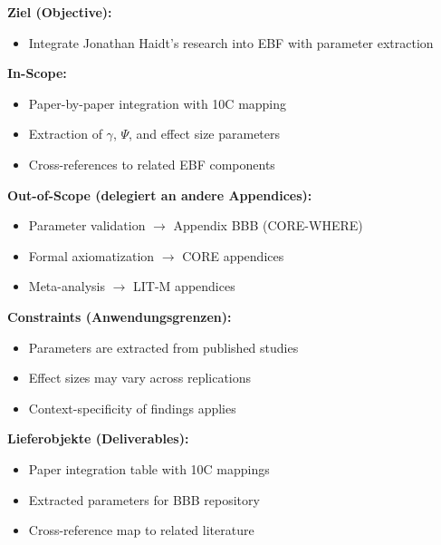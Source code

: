 
\begin{tcolorbox}[
    colback=orange!5!white,
    colframe=orange!75!black,
    title={\textbf{Appendix Scope: Ziel / In-Scope / Out-of-Scope / Constraints}},
    fonttitle=\bfseries
]

\textbf{Ziel (Objective):}
\begin{itemize}[nosep]
    \item Integrate Jonathan Haidt's research into EBF with parameter extraction
\end{itemize}

\textbf{In-Scope:}
\begin{itemize}[nosep]
    \item Paper-by-paper integration with 10C mapping
    \item Extraction of $\gamma$, $\Psi$, and effect size parameters
    \item Cross-references to related EBF components
\end{itemize}

\textbf{Out-of-Scope (delegiert an andere Appendices):}
\begin{itemize}[nosep]
    \item Parameter validation $\rightarrow$ Appendix BBB (CORE-WHERE)
    \item Formal axiomatization $\rightarrow$ CORE appendices
    \item Meta-analysis $\rightarrow$ LIT-M appendices
\end{itemize}

\textbf{Constraints (Anwendungsgrenzen):}
\begin{itemize}[nosep]
    \item Parameters are extracted from published studies
    \item Effect sizes may vary across replications
    \item Context-specificity of findings applies
\end{itemize}

\textbf{Lieferobjekte (Deliverables):}
\begin{itemize}[nosep]
    \item Paper integration table with 10C mappings
    \item Extracted parameters for BBB repository
    \item Cross-reference map to related literature
\end{itemize}

\end{tcolorbox}

